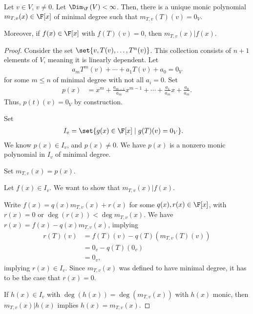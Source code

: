 \documentclass[10pt]{mypackage}
\begin{document}
\begin{theorem}
  Let $v\in V$, $v\neq 0$. Let $\Dim_{\F}\left(V\right) < \infty$. Then, there is a unique monic polynomial $m_{T,v}(x)\in \F[x]$ of minimal degree such that $m_{T,v}\left(T\right)\left(v\right) = 0_V$.\newline

  Moreover, if $f(x)\in \F[x]$ with $f(T)(v) = 0$, then $m_{T,v}(x)|f(x)$.
\end{theorem}
\begin{proof}
  Consider the set $\set{v,T(v),\dots,T^n(v)}$. This collection consists of $n+1$ elements of $V$, meaning it is linearly dependent. Let
  \begin{align*}
    a_mT^{m}\left(v\right) + \cdots + a_1T(v) + a_0 = 0_V
  \end{align*}
  for some $m \leq n$ of minimal degree with not all $a_i = 0$. Set
  \begin{align*}
    p(x) &= x^m + \frac{a_{m-1}}{a_m}x^{m-1} + \cdots + \frac{a_1}{a_m}x + \frac{a_0}{a_m}.
  \end{align*}
  Thus, $p(t)(v) = 0_V$ by construction.\newline

  Set
  \begin{align*}
    I_v &= \set{g(x)\in \F[x]\mid g(T)(v) = 0_V}.
  \end{align*}
  We know $p(x)\in I_v$, and $p(x)\neq 0$. We have $p(x)$ is a nonzero monic polynomial in $I_v$ of minimal degree.\newline

  Set $m_{T,v}(x) = p(x)$.\newline

  Let $f(x)\in I_v$. We want to show that $m_{T,v}(x)|f(x)$.\newline

  Write $f(x) = q(x)m_{T,v}(x) + r(x)$ for some $q(x),r(x)\in \F[x]$, with $r(x) = 0$ or $\deg \left(r(x)\right) < \deg m_{T,v}(x)$. We have $r(x) = f(x) - q(x)m_{T,v}(x)$, implying
  \begin{align*}
    r(T)(v) &= f(T)(v) - q(T)\left(m_{T,v}\left(T\right)(v)\right)\\
            &= 0_v- q(T)\left(0_v\right)\\
            &= 0_v,
  \end{align*}
  implying $r(x)\in I_v$. Since $m_{T,v}(x)$ was defined to have minimal degree, it has to be the case that $r(x) = 0$.\newline

  If $h(x) \in I_{v}$ with $\deg \left(h(x)\right) = \deg\left(m_{T,v}(x)\right)$ with $h(x)$ monic, then $m_{T,v}(x)|h(x)$ implies $h(x) = m_{T,v}(x)$.
\end{proof}
\end{document}
